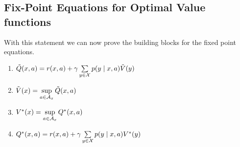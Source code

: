 \subsection{Fix-Point Equations for Optimal Value functions}
With this statement we can now prove the building blocks for the fixed point equations.

\begin{lemma}\label{V*,Q* relation}\leavevmode
\begin{enumerate}[label=(\roman*),font=\normalfont]
\item\label{i:1} \(\tilde{Q}(x,a)= r(x,a)+\gamma\sum\limits_{y\in\mathcal{X}}p(y\mid x,a)\tilde{V}(y)\)
\item\label{i:2} \(\tilde{V}(x)= \sup\limits_{a\in\mathcal{A}_x} \tilde{Q}(x,a)\)
\item\label{i:3} \(V^*(x)=\sup\limits_{a\in\mathcal{A}_x}Q^*(x,a)\)
\item\label{i:4} \(Q^*(x,a)=r(x,a)+\gamma \sum\limits_{y\in\mathcal{X}}p(y\mid x,a) V^*(y)\)
\end{enumerate}
\end{lemma}

